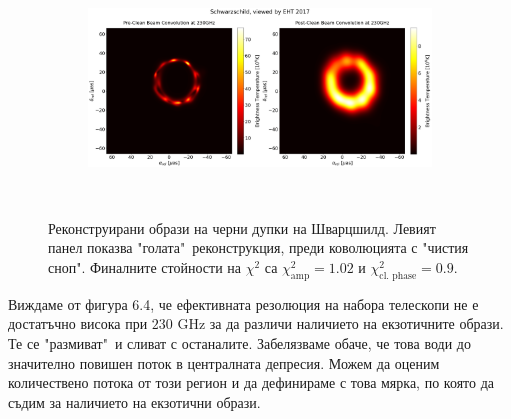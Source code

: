 \documentclass[12pt]{article}
\numberwithin{equation}{section}
\numberwithin{figure}{section}
\begin{document}
	\begin{figure}[h!]
		\centering
		\begin{subfigure}{12cm}
			\hspace{-1.5cm}
			\includegraphics[scale = 0.23]{Section_8_Observing_Horizonless_Objects/Ehtim_plot_2017_no_blur_Sch.png}
		\end{subfigure}\\
		\label{Kerr_EHT_2017}
		\caption[Реконструирани образи на черни дупки на Шварцшилд oт EHT 2017.]{\small Реконструирани образи на черни дупки на Шварцшилд. Левият панел показва "голата"$\,$ реконструкция, преди коволюцията с "чистия сноп". Финалните стойности на $\chi^2$ са $\chi^2_\text{amp} = 1.02$ и $\chi^2_\text{cl. phase} = 0.9$.} 
	\end{figure}
	
	Виждаме от фигура 6.4, че ефективната резолюция на набора телескопи не е достатъчно висока при $230$ GHz за да различи наличието на екзотичните образи. Те се "размиват"$\,$ и сливат с останалите. Забелязваме обаче, че това води до значително повишен поток в централната депресия. Можем да оценим количествено потока от този регион и да дефинираме с това мярка, по която да съдим за наличието на екзотични образи. 
	
\end{document}

